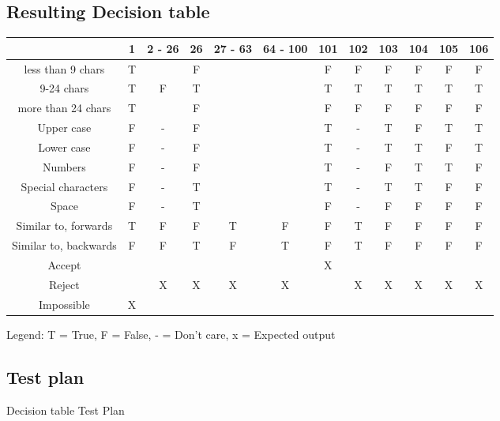 \documentclass[12pt,letterpaper]{article}
\begin{document}
\subsection{Resulting Decision table}


\begin{center}

    
  \begin{tabular}{c|c|c|c|c|c|c|c|c|c|c|c|}
  & 1 & 2 - 26 & 26 & 27 - 63 & 64 - 100 & 101 & 102 & 103 & 104 & 105 & 106 \\
  \hline
  less than 9 chars & T &  & F &  &  & F & F & F & F & F & F \\
  \hline
  9-24 chars & T & F & T &  &  & T & T & T & T & T & T \\
  \hline
  more than 24 chars & T &  & F & & & F & F & F & F & F & F \\
  \hline
  Upper case & F & - & F &  &  & T & - & T & F & T & T \\
  \hline
  Lower case & F & - & F &  &  & T & - & T & T & F & T \\
  \hline
  Numbers & F & - & F &  &  & T & - & F & T & T & F \\
  \hline
  Special characters & F & - & T &  &  & T & - & T & T & F & F \\
  \hline
  Space & F & - & T &  &  & F & - & F & F & F & F \\
  \hline 
  Similar to, forwards & T & F & F & T & F & F & T & F & F & F & F \\
  \hline
  Similar to, backwards & F & F & T & F & T & F & T & F & F & F & F \\
  \midrule
  Accept & & & & & & X & & & & & \\
  \hline
  Reject & & X & X & X & X & & X & X & X & X & X \\
  \hline
  Impossible & X & & & & & & & & & & \\
  \end{tabular}
    
  Legend: T = True, F = False, - = Don't care, x = Expected output
\end{center}


\subsection{Test plan}

\centering Decision table Test Plan
\end{document}
